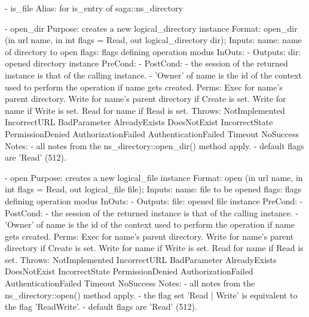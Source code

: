 \begin{myspec}
 
    - is_file
      Alias:    for is_entry of saga::ns_directory
 
 
    - open_dir
      Purpose:  creates a new logical_directory instance
      Format:   open_dir         (in  url       name,
                                  in  int       flags = Read,
                                  out logical_directory dir);
      Inputs:   name:             name of directory to open
                flags:            flags defining operation
                                  modus
      InOuts:   -
      Outputs:  dir:              opened directory instance
      PreCond:  -
      PostCond: - the session of the returned instance is that of
                  the calling instance.
                - 'Owner' of name is the id of the context
                  used to perform the operation if name gets
                  created.
      Perms:    Exec  for name's parent directory.
                Write for name's parent directory if Create is set.
                Write for name if Write is set.
                Read  for name if Read  is set.
      Throws:   NotImplemented
                IncorrectURL
                BadParameter
                AlreadyExists
                DoesNotExist
                IncorrectState
                PermissionDenied
                AuthorizationFailed
                AuthenticationFailed
                Timeout
                NoSuccess
      Notes:    - all notes from the ns_directory::open_dir()
                  method apply.
                - default flags are 'Read' (512).
 
 
    - open
      Purpose:  creates a new logical_file instance
      Format:   open             (in  url          name,
                                  in  int          flags = Read,
                                  out logical_file file);
      Inputs:   name:             file to be opened
                flags:            flags defining operation
                                  modus
      InOuts:   -
      Outputs:  file:             opened file instance
      PreCond:  -
      PostCond: - the session of the returned instance is that of
                  the calling instance.
                - 'Owner' of name is the id of the context
                  used to perform the operation if name gets
                  created.
      Perms:    Exec  for name's parent directory.
                Write for name's parent directory if Create is set.
                Write for name if Write is set.
                Read  for name if Read  is set.
      Throws:   NotImplemented
                IncorrectURL
                BadParameter
                AlreadyExists
                DoesNotExist
                IncorrectState
                PermissionDenied
                AuthorizationFailed
                AuthenticationFailed
                Timeout
                NoSuccess
      Notes:    - all notes from the ns_directory::open() method
                  apply.
                - the flag set 'Read | Write' is equivalent to
                  the flag 'ReadWrite'.
                - default flags are 'Read' (512).
 

\end{myspec}
